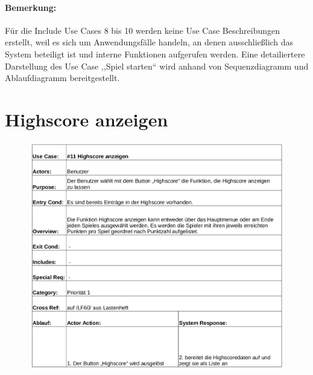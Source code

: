 \paragraph{Bemerkung: }Für die Include Use Cases 8 bis 10 werden keine Use Case Beschreibungen erstellt, weil es sich um Anwendungsfälle handeln, an denen ausschließlich das System beteiligt ist und interne Funktionen aufgerufen werden. Eine detailiertere Darstellung des Use Case ,,Spiel starten`` wird anhand von Sequenzdiagramm und Ablaufdiagramm bereitgestellt.

\clearpage
\section{Highscore anzeigen}
\begin{figure}[!h]
	\centering
    \includegraphics[width=\textwidth]{./ucbHighscore.png}
	\label{}
\end{figure}
